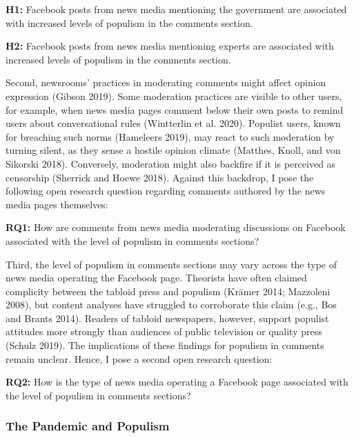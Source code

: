 \documentclass[
]{ccr}
\begin{document}
\textbf{H1:} Facebook posts from news media mentioning the government
are associated with increased levels of populism in the comments
section.

\textbf{H2:} Facebook posts from news media mentioning experts are
associated with increased levels of populism in the comments section.

Second, newsrooms' practices in moderating comments might affect opinion
expression (Gibson 2019). Some moderation practices are visible to other
users, for example, when news media pages comment below their own posts
to remind users about conversational rules (Wintterlin et al. 2020).
Populist users, known for breaching such norms (Hameleers 2019), may
react to such moderation by turning silent, as they sense a hostile
opinion climate (Matthes, Knoll, and von Sikorski 2018). Conversely,
moderation might also backfire if it is perceived as censorship
(Sherrick and Hoewe 2018). Against this backdrop, I pose the following
open research question regarding comments authored by the news media
pages themselves:

\textbf{RQ1:} How are comments from news media moderating discussions on
Facebook associated with the level of populism in comments sections?

Third, the level of populism in comments sections may vary across the
type of news media operating the Facebook page. Theorists have often
claimed complicity between the tabloid press and populism (Krämer 2014;
Mazzoleni 2008), but content analyses have struggled to corroborate this
claim (e.g., Bos and Brants 2014). Readers of tabloid newspapers,
however, support populist attitudes more strongly than audiences of
public television or quality press (Schulz 2019). The implications of
these findings for populism in comments remain unclear. Hence, I pose a
second open research question:

\textbf{RQ2:} How is the type of news media operating a Facebook page
associated with the level of populism in comments sections?

\hypertarget{the-pandemic-and-populism}{%
\subsubsection{The Pandemic and
Populism}\label{the-pandemic-and-populism}}
\end{document}
